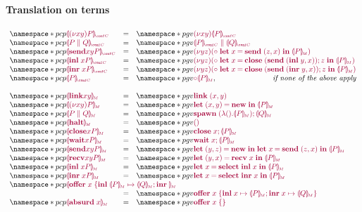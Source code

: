 \documentclass[main.tex]{subfiles}
\begin{document}
\paragraph{Translation on terms}
\[
\begin{array}{lcl}
  \pcp{\tm{\cpgvC{\res{x}{y}{P}}}}
  & = & \pgv{\tm{\res{x}{y}{\cpgvC{P}}}} \\
  \pcp{\tm{\cpgvC{\ppar{P}{Q}}}}
  & = & \pgv{\tm{\ppar{\cpgvC{P}}{\cpgvC{Q}}}} \\
  \pcp{\tm{\cpgvC{\send{x}{y}{P}}}}
  & = & \pgv{\tm{\res{y}{z}{(\child\;\letbind{x}{\send\;\pair{z}{x}}{\cpgvM{P}})}}} \\
  \pcp{\tm{\cpgvC{\inl{x}{P}}}}
  & = & \pgv{\tm{\res{y}{z}{(\child\;\letbind{x}{\andthen{\close\;(\send\;\pair{\inl{y}}{x})}{z}}{\cpgvM{P}})}}} \\
  \pcp{\tm{\cpgvC{\inr{x}{P}}}}
  & = & \pgv{\tm{\res{y}{z}{(\child\;\letbind{x}{\andthen{\close\;(\send\;\pair{\inr{y}}{x})}{z}}{\cpgvM{P}})}}} \\
  \pcp{\tm{\cpgvC{P}}}
  & = & \pgv{\tm{\child{\cpgvM{P}}}},\hfill\textit{if none of the above apply}\\
  \\
  \pcp{\tm{\cpgvM{\link{x}{y}}}}
  & = & \pgv{\tm{\link\;{\pair{x}{y}}}} \\
  \pcp{\tm{\cpgvM{\res{x}{y}{P}}}}
  & = & \pgv{\tm{\letpair{x}{y}{\new}{\cpgvM{P}}}} \\
  \pcp{\tm{\cpgvM{\ppar{P}{Q}}}}
  & = & \pgv{\tm{\andthen{\spawn\;{(\lambda\unit.\cpgvM{P})}}{\cpgvM{Q}}}} \\
  \pcp{\tm{\cpgvM{\halt}}}
  & = & \pgv{\tm{\unit}} \\
  \pcp{\tm{\cpgvM{\close{x}{P}}}}
  & = & \pgv{\tm{\andthen{\close\;{x}}{\cpgvM{P}}}} \\
  \pcp{\tm{\cpgvM{\wait{x}{P}}}}
  & = & \pgv{\tm{\andthen{\wait\;{x}}{\cpgvM{P}}}} \\
  \pcp{\tm{\cpgvM{\send{x}{y}{P}}}}
  & = & \pgv{\tm{\letpair{y}{z}{\new}{\letbind{x}{\send\;{\pair{z}{x}}}{\cpgvM{P}}}}} \\
  \pcp{\tm{\cpgvM{\recv{x}{y}{P}}}}
  & = & \pgv{\tm{\letpair{y}{x}{\recv\;{x}}{\cpgvM{P}}}} \\
  \pcp{\tm{\cpgvM{\inl{x}{P}}}}
  & = & \pgv{\tm{\letbind{x}{\select{\labinl}\;{x}}{\cpgvM{P}}}} \\
  \pcp{\tm{\cpgvM{\inr{x}{P}}}}
  & = & \pgv{\tm{\letbind{x}{\select{\labinr}\;{x}}{\cpgvM{P}}}} \\
  \multicolumn{3}{l}{\pcp{\tm{\cpgvM{\offer{x}{\cpgvM{P}}{\cpgvM{Q}}}}}} \\
  & = & \pgv{\tm{\offer{x}{x}{\cpgvM{P}}{x}{\cpgvM{Q}}}} \\
  \pcp{\tm{\cpgvM{\absurd{x}}}}
  & = & \pgv{\tm{\offeremp{x}}} \\
\end{array}
\]
\end{document}
